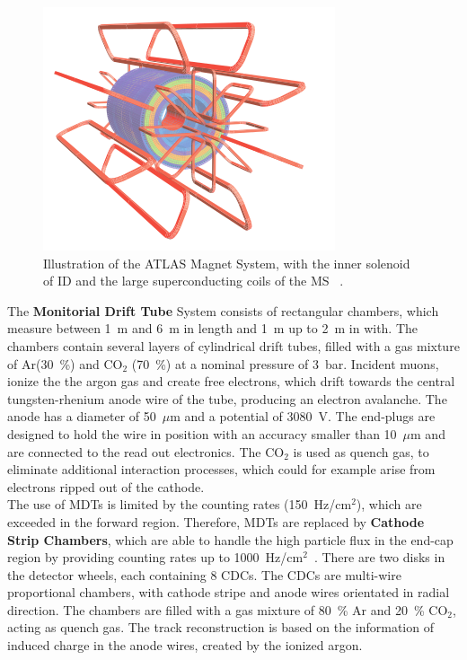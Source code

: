 \begin{figure}[h]
	\centering
	\includegraphics[width=0.4\linewidth]{Pics/cp3/37}
	\caption{Illustration of the ATLAS Magnet System, with the inner solenoid of ID and the large superconducting coils of the MS ~\cite{Aad:2008zzm}.} 
	\label{fig:37}
\end{figure}



\noindent The \textbf{Monitorial Drift Tube} System consists of rectangular  chambers, which measure between 1~m and 6~m in length and 1~m up to 2~m in with. The chambers contain several layers of cylindrical drift tubes, filled with a gas mixture of Ar(30~\%) and CO$_2$ (70~\%) at a nominal  pressure of 3~bar. Incident muons, ionize the the argon gas and create free electrons, which drift towards the central tungsten-rhenium anode wire of the tube, producing an electron avalanche.  The anode has a diameter of 50~$\mu$m and a potential of 3080~V. The end-plugs are designed to hold the wire in position with an accuracy smaller than 10~$\mu$m and are connected to the read out electronics. The CO$_2$ is used as quench gas, to eliminate additional interaction processes, which could for example arise from electrons ripped out of the cathode.\\   

\noindent The use of MDTs is limited by the counting rates (150~Hz/cm$^2$), which are exceeded in the forward region. Therefore, MDTs are replaced by \textbf{Cathode Strip Chambers}, which are able to handle the high particle flux in the end-cap region by providing counting rates up to 1000~Hz/cm$^2$~\cite{ATLAS:1999uwa}. There are two disks in the detector wheels, each containing 8 CDCs. The CDCs are multi-wire proportional chambers, with cathode stripe  and anode wires orientated in radial direction. The chambers are filled with a gas mixture of  80~\% Ar and 20~\% CO$_2$, acting as quench gas. The track reconstruction is based on the information of induced charge in the anode wires, created by the ionized argon.\\

